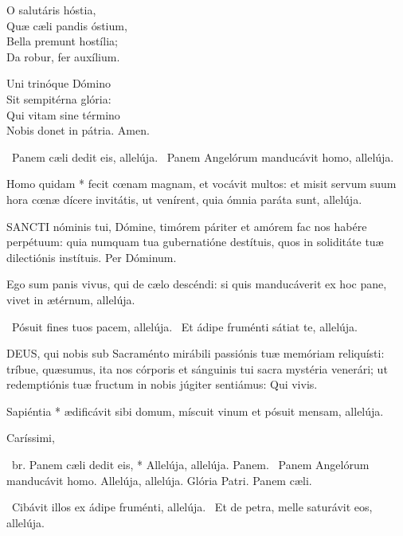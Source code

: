 O salutáris hóstia,\\
Quæ cæli pandis óstium,\\
Bella premunt hostília;\\
Da robur, fer auxílium.


Uni trinóque Dómino\\
Sit sempitérna glória:\\
Qui vitam sine término\\
Nobis donet in pátria. Amen.

\V\ Panem cæli dedit eis, allelúja. \R\ Panem Angelórum manducávit homo, allelúja.

 Homo quidam * fecit cœnam magnam, et vocávit multos: et misit servum suum hora cœnæ dícere invitátis, ut venírent, quia ómnia paráta sunt, allelúja.


\lettrine[lines=2]{S}{ANCTI} nóminis tui, Dómine, timórem páriter et amórem fac nos habére perpétuum: quia numquam tua gubernatióne destítuis, quos in soliditáte tuæ dilectiónis instítuis. Per Dóminum.


 Ego sum panis vivus, qui de cælo descéndi: si quis manducáverit ex hoc pane, vivet in ætérnum, allelúja.

\V\ Pósuit fines tuos pacem, allelúja. \R\ Et ádipe fruménti sátiat te, allelúja.


\lettrine[lines=2]{D}{EUS}, qui nobis sub Sacraménto mirábili passiónis tuæ memóriam reliquísti: tríbue, quæsumus, ita nos córporis et sánguinis tui sacra mystéria venerári; ut redemptiónis tuæ fructum in nobis júgiter sentiámus: Qui vivis.


 Sapiéntia * ædificávit sibi domum, míscuit vinum et pósuit mensam, allelúja.


 Caríssimi, 

\R\ br. Panem cæli dedit eis, * Allelúja, allelúja. Panem. \V\ Panem Angelórum manducávit homo. Allelúja, allelúja. Glória Patri. Panem cæli.

\V\ Cibávit illos ex ádipe fruménti, allelúja. \R\ Et de petra, melle saturávit eos, allelúja.

